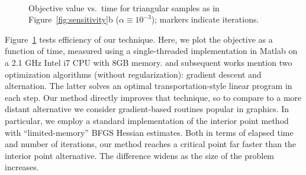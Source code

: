 \begin{figure}[t]\centering
{}\\\vspace{-.15in}
\caption{Objective value vs.\ time for triangular samples as in Figure~\ref{fig:sensitivity}b ($\alpha\equiv10^{-3}$); markers indicate iterations.}\label{fig:efficiency}
\end{figure}

Figure~\ref{fig:efficiency} tests efficiency of our technique.  Here, we plot the \GWa objective as a function of time, measured using a single-threaded implementation in Matlab on a 2.1 GHz Intel i7 CPU with 8GB memory.  \cite{memoli-2011} and subsequent works mention two optimization algorithms (without regularization):  gradient descent and alternation.  The latter solves an optimal transportation-style linear program in each step.  Our method directly improves that technique, so to compare to a more distant alternative we consider gradient-based routines popular in graphics.  In particular, we employ a standard implementation of the interior point method~\cite{waltz-2006} with ``limited-memory'' BFGS Hessian estimates.  Both in terms of elapsed time and number of iterations, our method reaches a critical point far faster than the interior point alternative.  The difference widens as the size of the problem increases.

